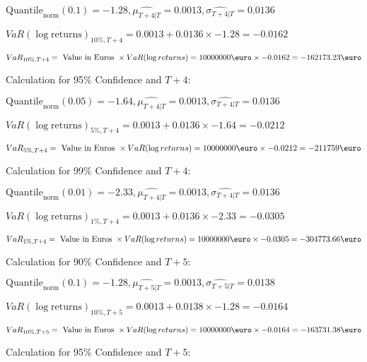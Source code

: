 \indent\indent $\text{Quantile}_\text{norm}(0.1) = -1.28,\hat{\mu_{T+4|T}} = 0.0013, \hat{\sigma_{T+4|T}} = 0.0136$

\indent\indent $VaR(\log \text{returns})_{10\%, T + 4} = 0.0013 + 0.0136\times-1.28 = -0.0162$

\indent\indent $VaR_{10\%, T + 4} = \text{ Value in Euros } \times VaR(\log returns) = 10 000 000 \text{\euro} \times-0.0162 = -162173.23 \text{\euro}$\newline




Calculation for 95\% Confidence and $T+4$:

\indent\indent $\text{Quantile}_\text{norm}(0.05) = -1.64,\hat{\mu_{T+4|T}} = 0.0013, \hat{\sigma_{T+4|T}} = 0.0136$

\indent\indent $VaR(\log \text{returns})_{5\%, T + 4} = 0.0013 + 0.0136\times-1.64 = -0.0212$

\indent\indent $VaR_{5\%, T + 4} = \text{ Value in Euros } \times VaR(\log returns) = 10 000 000 \text{\euro} \times-0.0212 = -211759 \text{\euro}$\newline




Calculation for 99\% Confidence and $T+4$:

\indent\indent $\text{Quantile}_\text{norm}(0.01) = -2.33,\hat{\mu_{T+4|T}} = 0.0013, \hat{\sigma_{T+4|T}} = 0.0136$

\indent\indent $VaR(\log \text{returns})_{1\%, T + 4} = 0.0013 + 0.0136\times-2.33 = -0.0305$

\indent\indent $VaR_{1\%, T + 4} = \text{ Value in Euros } \times VaR(\log returns) = 10 000 000 \text{\euro} \times-0.0305 = -304773.66 \text{\euro}$\newline




Calculation for 90\% Confidence and $T+5$:

\indent\indent $\text{Quantile}_\text{norm}(0.1) = -1.28,\hat{\mu_{T+5|T}} = 0.0013, \hat{\sigma_{T+5|T}} = 0.0138$

\indent\indent $VaR(\log \text{returns})_{10\%, T + 5} = 0.0013 + 0.0138\times-1.28 = -0.0164$

\indent\indent $VaR_{10\%, T + 5} = \text{ Value in Euros } \times VaR(\log returns) = 10 000 000 \text{\euro} \times-0.0164 = -163731.38 \text{\euro}$\newline




Calculation for 95\% Confidence and $T+5$:

